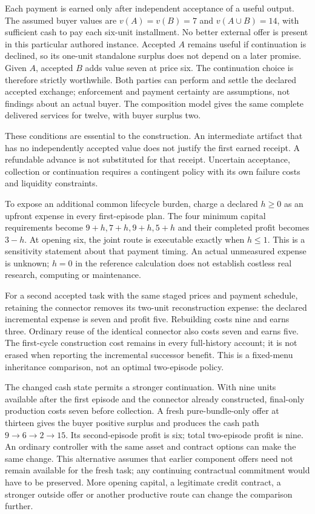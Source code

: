 Each payment is earned only after independent acceptance of a useful output. The assumed buyer values are $v(A)=v(B)=7$ and $v(A\cup B)=14$, with sufficient cash to pay each six-unit installment. No better external offer is present in this particular authored instance. Accepted $A$ remains useful if continuation is declined, so its one-unit standalone surplus does not depend on a later promise. Given $A$, accepted $B$ adds value seven at price six. The continuation choice is therefore strictly worthwhile. Both parties can perform and settle the declared accepted exchange; enforcement and payment certainty are assumptions, not findings about an actual buyer. The composition model gives the same complete delivered services for twelve, with buyer surplus two.

These conditions are essential to the construction. An intermediate artifact that has no independently accepted value does not justify the first earned receipt. A refundable advance is not substituted for that receipt. Uncertain acceptance, collection or continuation requires a contingent policy with its own failure costs and liquidity constraints.

To expose an additional common lifecycle burden, charge a declared $h\ge0$ as an upfront expense in every first-episode plan. The four minimum capital requirements become $9+h,7+h,9+h,5+h$ and their completed profit becomes $3-h$. At opening six, the joint route is executable exactly when $h\le1$. This is a sensitivity statement about that payment timing. An actual unmeasured expense is unknown; $h=0$ in the reference calculation does not establish costless real research, computing or maintenance.

For a second accepted task with the same staged prices and payment schedule, retaining the connector removes its two-unit reconstruction expense: the declared incremental expense is seven and profit five. Rebuilding costs nine and earns three. Ordinary reuse of the identical connector also costs seven and earns five. The first-cycle construction cost remains in every full-history account; it is not erased when reporting the incremental successor benefit. This is a fixed-menu inheritance comparison, not an optimal two-episode policy.

The changed cash state permits a stronger continuation. With nine units available after the first episode and the connector already constructed, final-only production costs seven before collection. A fresh pure-bundle-only offer at thirteen gives the buyer positive surplus and produces the cash path $9\to6\to2\to15$. Its second-episode profit is six; total two-episode profit is nine. An ordinary controller with the same asset and contract options can make the same change. This alternative assumes that earlier component offers need not remain available for the fresh task; any continuing contractual commitment would have to be preserved. More opening capital, a legitimate credit contract, a stronger outside offer or another productive route can change the comparison further.

